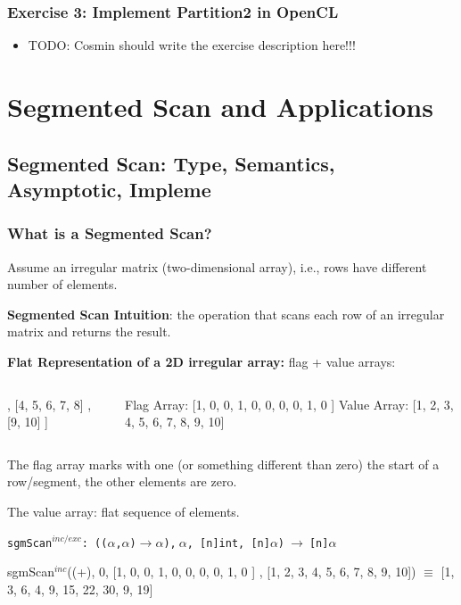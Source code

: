 \documentclass{beamer}
\renewcommand{\emph}[1]{\textcolor{CosGreen}{ #1}}
\newcommand{\emp}[1]{\textcolor{DikuRed}{ #1}}
\newcommand{\mymath}[1]{$ #1 $}
\newcommand{\myindu}[1]{^{#1}}
\begin{document}
\begin{frame}[fragile,t]
  \frametitle{Exercise 3: Implement Partition2 in OpenCL}

\begin{itemize}
    \item TODO: Cosmin should write the exercise description here!!!
\end{itemize}

\end{frame}

\section{Segmented Scan and Applications}

\subsection{Segmented Scan: Type, Semantics, Asymptotic, Impleme}

\begin{frame}[fragile,t]
  \frametitle{What is a Segmented Scan?}

\pause
Assume an \emp{irregular} matrix (two-dimensional array), 
i.e., rows have different number of elements.\medskip

{\bf Segmented Scan Intuition}: the operation that scans each
row of an irregular matrix and returns the result.\medskip

{\bf Flat Representation of a 2D irregular array:} flag + value arrays:
\pause
\begin{columns}
\begin{colorcode}
[ [1, 2, 3]
, [4, 5, 6, 7, 8]
, [9, 10]
]
\end{colorcode}
\begin{colorcode}
Flag Array:
[1, 0, 0, 1, 0, 0, 0, 0, 1, 0 ]
Value Array:
[1, 2, 3, 4, 5, 6, 7, 8, 9, 10]
\end{colorcode}
\end{columns}\medskip

\emp{The flag array} marks with one (or something different than zero) 
the start of a row/segment, the other elements are zero.\medskip

\emp{The value array}: flat sequence of elements. \bigskip

\begin{scriptsize}
\emp{{\tt sgmScan$^{inc/exc}$:~(($\alpha$,$\alpha$)$\rightarrow\alpha$),$~\alpha$,~[n]int,~[n]$\alpha$)$~\rightarrow~$[n]$\alpha$}}\\
\begin{colorcode}
\emp{sgmScan\mymath{\myindu{inc}}((+), 0, [1, 0, 0, 1, 0, 0,  0,  0,  1, 0 ]}
               \emp{ , [1, 2, 3, 4, 5, 6,  7,  8,  9, 10])} \mymath{\equiv}\pause
               \emph{   [1, 3, 6, 4, 9, 15, 22, 30, 9, 19]}
\end{colorcode}
\end{scriptsize}
\end{frame}
\end{document}
